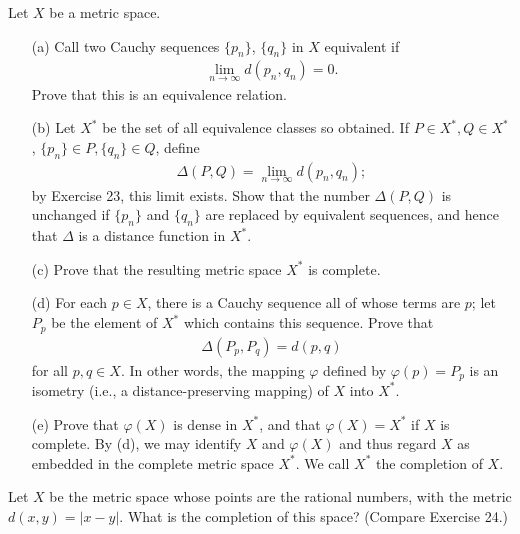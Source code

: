   \begin{exercise}[Rudin 3.24]
    Let $X$ be a metric space.
    \begin{enumerate} 
      \item[(a)] Call two Cauchy sequences $\{p_n\}$, $\{q_n\}$ in $X$ equivalent if
      \begin{align*}
        \lim_{n \to \infty} d(p_n, q_n) = 0.
      \end{align*}
      Prove that this is an equivalence relation.
      \item[(b)] Let $X^*$ be the set of all equivalence classes so obtained. If $P \in X^*, Q \in X^*$, $\{p_n\} \in P, \{q_n\} \in Q$, define
      \begin{align*}
        \Delta(P, Q) = \lim_{n \to \infty} d(p_n, q_n);
      \end{align*}
      by Exercise 23, this limit exists. Show that the number $\Delta(P, Q)$ is unchanged if $\{p_n\}$ and $\{q_n\}$ are replaced by equivalent sequences, and hence that $\Delta$ is a distance function in $X^*$.
      \item[(c)] Prove that the resulting metric space $X^*$ is complete.
      \item[(d)] For each $p \in X$, there is a Cauchy sequence all of whose terms are $p$; let $P_p$ be the element of $X^*$ which contains this sequence. Prove that
      \begin{align*}
        \Delta(P_p, P_q) = d(p, q)
      \end{align*}
      for all $p, q \in X$. In other words, the mapping $\varphi$ defined by $\varphi(p) = P_p$ is an isometry (i.e., a distance-preserving mapping) of $X$ into $X^*$.
      \item[(e)] Prove that $\varphi(X)$ is dense in $X^*$, and that $\varphi(X) = X^*$ if $X$ is complete. By (d), we may identify $X$ and $\varphi(X)$ and thus regard $X$ as embedded in the complete metric space $X^*$. We call $X^*$ the completion of $X$.
    \end{enumerate}
  \end{exercise}
  \begin{solution}
    
  \end{solution}

  \begin{exercise}[Rudin 3.25]
    Let $X$ be the metric space whose points are the rational numbers, with the metric $d(x, y) = |x - y|$. What is the completion of this space? (Compare Exercise 24.)
  \end{exercise}
  \begin{solution}
    
  \end{solution}

